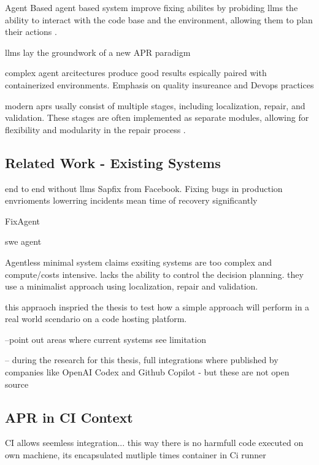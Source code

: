 Agent Based
agent based system improve fixing abilites by probiding llms the ability to interact with the code base and the environment, allowing them to plan their actions  \cite{yangSWEagentAgentComputerInterfaces2024}.

llms lay the groundwork of a new APR paradigm \cite{chenUnveilingPitfallsUnderstanding2025}

complex agent arcitectures produce good results espically paired with containerized environments. Emphasis on quality insureance and Devops practices \cite{puvvadiCodingAgentsComprehensive2025}


modern aprs usally consist of multiple stages, including localization, repair, and validation. These stages are often implemented as separate modules, allowing for flexibility and modularity in the repair process \cite{yangSWEagentAgentComputerInterfaces2024}.

\subsection{Related Work - Existing Systems}


end to end without llms Sapfix from Facebook. Fixing bugs in production envrioments lowerring incidents mean time of recovery significantly \cite{margineanSapFixAutomatedEndtoEnd2019}

FixAgent \cite{leeUnifiedDebuggingApproach2024}

swe agent \cite{yangSWEagentAgentComputerInterfaces2024}

Agentless minimal system \cite{xiaAgentlessDemystifyingLLMbased2024}
claims exsiting systems are too complex and compute/costs intensive.
lacks the ability to control the decision planning.
they use a minimalist approach using localization, repair and validation.


this appraoch inspried the thesis to test how a simple approach will perform in a real world scendario on a code hosting platform.


--point out areas where current systems see limitation

-- during the research for this thesis, full integrations where published by companies like OpenAI Codex and Github Copilot - but these are not open source


\subsection{APR in CI Context}

CI allows seemless integration...
this way there is no harmfull code executed on own machiene, its encapsulated mutliple times container in Ci runner
